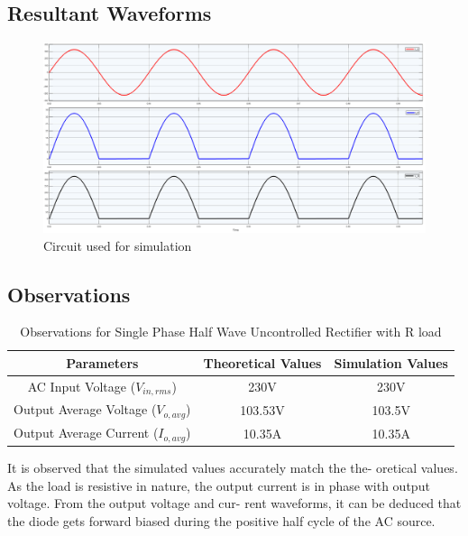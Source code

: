 \subsection{Resultant Waveforms}

\begin{figure}[h]
    \centering
    \includegraphics[width=1\textwidth]{images/experiment-1/circuit-scope-simulation-01.png}
    \caption{Circuit used for simulation}
    \label{Fig_waveform_single-phase-half-wave-uncontrolled-rectifier-with-R-load}
\end{figure}

\subsection{Observations}

\begin{table}[h]
    \renewcommand{\arraystretch}{1.3}
    \caption{Observations for Single Phase Half Wave Uncontrolled Rectifier with R
        load}
    \label{table_observation_circuit_1}
    \centering
    \begin{tabular}{|c|c|c|}
        \hline
        Parameters                              & Theoretical Values & Simulation Values \\
        \hline
        \hline
        AC Input Voltage ($ V_{in,rms} $)       & 230V               & 230V              \\
        \hline
        Output Average Voltage ($ V_{o,avg} $)  & 103.53V            & 103.5V            \\
        \hline
        Output Average Current ($ I_{o,avg}  $) & 10.35A             & 10.35A            \\
        \hline
    \end{tabular}
\end{table}


It is observed that the simulated values accurately match the the-
oretical values. As the load is resistive in nature, the output current
is in phase with output voltage. From the output voltage and cur-
rent waveforms, it can be deduced that the diode gets forward biased
during the positive half cycle of the AC source.

